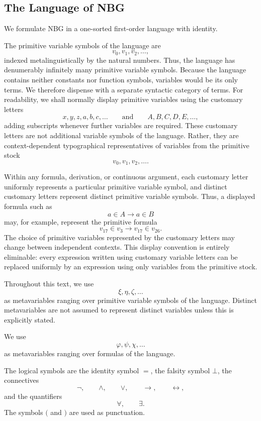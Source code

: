 \subsection{The Language of NBG}\label{sec:language}


We formulate NBG in a one-sorted first-order language with identity.

The primitive variable symbols of the language are
\[
v_0,v_1,v_2,\ldots,
\]
indexed metalinguistically by the natural numbers. Thus, the language has denumerably infinitely many primitive variable symbols. Because the language contains neither constants nor function symbols, variables would be its only terms. We therefore dispense with a separate syntactic category of terms.
For readability, we shall normally display primitive variables using the customary letters
\[
x,y,z,a,b,c,\ldots
\qquad\text{and}\qquad
A,B,C,D,E,\ldots,
\]
adding subscripts whenever further variables are required. These customary letters are not additional variable symbols of the language. Rather, they are context-dependent typographical representatives of variables from the primitive stock
\[
v_0,v_1,v_2,\ldots.
\]

Within any formula, derivation, or continuous argument, each customary letter uniformly represents a particular primitive variable symbol, and distinct customary letters represent distinct primitive variable symbols. Thus, a displayed formula such as
\[
a\in A\to a\in B
\]
may, for example, represent the primitive formula
\[
v_{17}\in v_3\to v_{17}\in v_{26}.
\]
The choice of primitive variables represented by the customary letters may change between independent contexts. This display convention is entirely eliminable: every expression written using customary variable letters can be replaced uniformly by an expression using only variables from the primitive stock. 

Throughout this text, we use
\[
\xi,\eta,\zeta,\ldots
\]
as metavariables ranging over primitive variable symbols of the language. Distinct metavariables are not assumed to represent distinct variables unless this is explicitly stated.

We use
\[
\varphi,\psi,\chi,\ldots
\]
as metavariables ranging over formulas of the language.

The logical symbols are the identity symbol \(=\), the falsity symbol \(\bot\), the connectives
\[
\neg,\qquad
\land,\qquad
\lor,\qquad
\to,\qquad
\leftrightarrow,
\]
and the quantifiers
\[
\forall,\qquad
\exists.
\]
The symbols \(\lparen\) and \(\rparen\) are used as punctuation.

